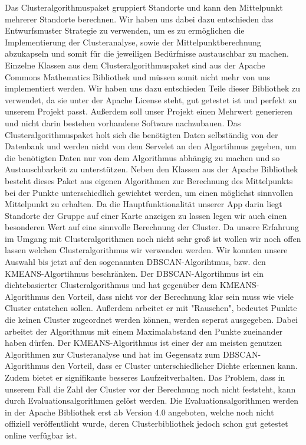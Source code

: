 Das Clusteralgorithmuspaket gruppiert Standorte und kann den Mittelpunkt mehrerer Standorte berechnen. Wir haben uns dabei dazu entschieden das Entwurfsmuster Strategie zu verwenden, um es zu ermöglichen die Implementierung der Clusteranalyse, sowie der Mittelpunktberechnung abzukapseln und somit für die jeweiligen Bedürfnisse austauschbar zu machen. Einzelne Klassen aus dem Clusteralgorithmuspaket sind aus der Apache Commons Mathematics Bibliothek und müssen somit nicht mehr von uns implementiert werden. Wir haben uns dazu entschieden Teile dieser Bibliothek zu verwendet, da sie unter der Apache License steht, gut getestet ist und perfekt zu unserem Projekt passt. Außerdem soll unser Projekt einen Mehrwert generieren und nicht darin bestehen vorhandene Software nachzubauen. Das Clusteralgorithmuspaket holt sich die benötigten Daten selbständig von der Datenbank und werden nicht von dem Servelet an den Algortihmus gegeben, um die benötigten Daten nur von dem Algorithmus abhängig zu machen und so Austauschbarkeit zu unterstützen. Neben den Klassen aus der Apache Bibliothek besteht dieses Paket aus eigenen Algorithmen zur Berechnung des Mittelpunkts bei der Punkte unterschiedlich gewichtet werden, um einen möglichst sinnvollen Mittelpunkt zu erhalten. Da die Hauptfunktionalität unserer App darin liegt Standorte der Gruppe auf einer Karte anzeigen zu lassen legen wir auch einen besonderen Wert auf eine sinnvolle Berechnung der Cluster. Da unsere Erfahrung im Umgang mit Clusteralgorithmen noch nicht sehr groß ist wollen wir noch offen lassen welchen Clusteralgorithmus wir verwenden werden. Wir konnten unsere Auswahl bis jetzt auf den sogenannten DBSCAN-Algorihtmus, bzw. den KMEANS-Algortihmus beschränken. Der DBSCAN-Algortihmus ist ein dichtebasierter Clusteralgorithmus und hat gegenüber dem KMEANS-Algorithmus den Vorteil, dass nicht vor der Berechnung klar sein muss wie viele Cluster entstehen sollen. Außerdem arbeitet er mit "Rauschen", bedeutet Punkte die keinen Cluster zugeordnet werden können, werden seperat ausgegeben. Dabei arbeitet der Algorithmus mit einem Maximalabstand den Punkte zueinander haben dürfen. 
Der KMEANS-Algorithmus ist einer der am meisten genutzen Algorithmen zur Clusteranalyse und hat im Gegensatz zum DBSCAN-Algorithmus den Vorteil, dass er Cluster unterschiedlicher Dichte erkennen kann. Zudem bietet er signifikante besseres Laufzeitverhalten. Das Problem, dass in unserem Fall die Zahl der Cluster vor der Berechnung noch nicht feststeht, kann durch Evaluationsalgorithmen gelöst werden. Die Evaluationsalgorithmen werden in der Apache Bibliothek erst ab Version 4.0 angeboten, welche noch nicht offiziell veröffentlicht wurde, deren Clusterbibliothek jedoch schon gut getestet online verfügbar ist.
